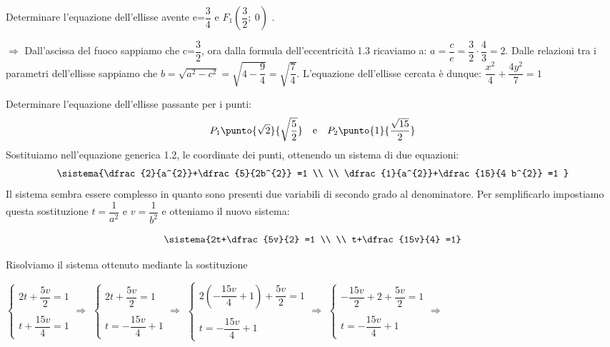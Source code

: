\begin{esempio}
Determinare l'equazione dell'ellisse 
avente e=$ \dfrac{3}{4} $ e $ F_{1} \left( \dfrac{3}{2} ;~0\right)$ .

$\Rightarrow$ Dall'ascissa del fuoco sappiamo che c=$ \dfrac{3}{2} $, ora 
dalla formula dell'eccentricità 1.3 ricaviamo a: $a= 
\dfrac{c}{e}=\dfrac{3}{2}\cdot\dfrac{4}{3}=2$. Dalle relazioni tra i 
parametri dell'ellisse sappiamo che 
$b=\sqrt{a^{2}-c^{2}}=\sqrt{4-\dfrac{9}{4}}=\sqrt{\dfrac{7}{4}}$.
L'equazione dell'ellisse cercata è dunque: $ 
\dfrac{x^{2}}{4}+\dfrac{4y^{2}}{7} =1$
\end{esempio}

\begin{esempio} 
 
Determinare l'equazione dell'ellisse 
passante per i punti:
\[P_{1} \punto{\sqrt{2}}{\sqrt{\dfrac{5}{2}}} \quad \text{e} \quad 
  P_{2} \punto{1}{\dfrac{\sqrt{15}}{2}}\]
Sostituiamo nell'equazione generica 1.2, le coordinate dei 
punti, ottenendo un sistema di due equazioni:
\[\sistema{\dfrac{2}{a^{2}}+\dfrac{5}{2b^{2}} =1   \\ \\ 
\dfrac{1}{a^{2}}+\dfrac{15}{4 b^{2}} =1 }\]
Il sistema sembra essere complesso in quanto sono 
presenti due variabili di secondo grado al denominatore. Per semplificarlo 
impostiamo questa sostituzione 
$t= \dfrac{1}{a^{2}} $ e $v= \dfrac{1}{b^{2}} $ 
e otteniamo il nuovo sistema:

\[\sistema{2t+\dfrac{5v}{2} =1 \\ \\ t+\dfrac{15v}{4} =1}\]

Risolviamo il sistema ottenuto mediante la sostituzione

\vspace{6pt}
$\begin{cases}  2t+\dfrac{5v}{2} =1 \\ \\ t+\dfrac{15v}{4} =1  
\end{cases} \Rightarrow$ 
$\begin{cases}  2t+\dfrac{5v}{2} =1 \\  \\ t=-\dfrac{15v}{4} +1
\end{cases} \Rightarrow$
$\begin{cases}  2(-\dfrac{15v}{4}+1)+\dfrac{5v}{2}=1 \\ \\ t=-\dfrac{15v}{4} +1
\end{cases} \Rightarrow$
$\begin{cases}  -\dfrac{15v}{2}+2+\dfrac{5v}{2} =1 \\  \\ t=-\dfrac{15v}{4} +1 
\end{cases} \Rightarrow$


\end{esempio}
